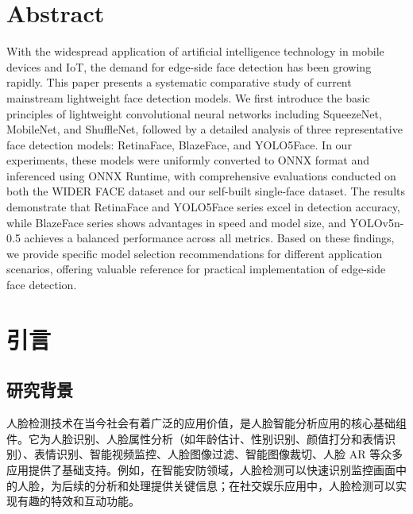 \documentclass{article}
\begin{document}
\section*{Abstract}
With the widespread application of artificial intelligence technology in mobile devices and IoT, the demand for edge-side face detection has been growing rapidly. This paper presents a systematic comparative study of current mainstream lightweight face detection models. We first introduce the basic principles of lightweight convolutional neural networks including SqueezeNet, MobileNet, and ShuffleNet, followed by a detailed analysis of three representative face detection models: RetinaFace, BlazeFace, and YOLO5Face. In our experiments, these models were uniformly converted to ONNX format and inferenced using ONNX Runtime, with comprehensive evaluations conducted on both the WIDER FACE dataset and our self-built single-face dataset. The results demonstrate that RetinaFace and YOLO5Face series excel in detection accuracy, while BlazeFace series shows advantages in speed and model size, and YOLOv5n-0.5 achieves a balanced performance across all metrics. Based on these findings, we provide specific model selection recommendations for different application scenarios, offering valuable reference for practical implementation of edge-side face detection.

\vfill %

\clearpage

\thispagestyle{empty}
\hypersetup{linkcolor=black}
\tableofcontents
\hypersetup{linkcolor=blue}
\newpage


\setcounter{page}{1}

\section{引言}
\subsection{研究背景}
人脸检测技术在当今社会有着广泛的应用价值，是人脸智能分析应用的核心基础组件。它为人脸识别、人脸属性分析（如年龄估计、性别识别、颜值打分和表情识别）、表情识别、智能视频监控、人脸图像过滤、智能图像裁切、人脸 AR 等众多应用提供了基础支持。例如，在智能安防领域，人脸检测可以快速识别监控画面中的人脸，为后续的分析和处理提供关键信息；在社交娱乐应用中，人脸检测可以实现有趣的特效和互动功能。
\end{document}
